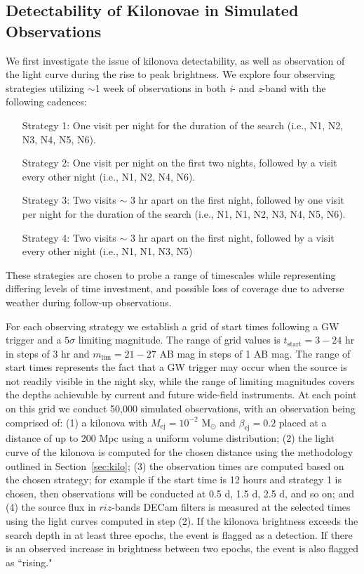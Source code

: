 \subsection{Detectability of Kilonovae in Simulated Observations}
\label{sec:MCsims_det}
We first investigate the issue of kilonova detectability, as well as observation of the light curve during the rise to peak brightness. We explore four observing strategies utilizing $\sim$1 week of observations in both {\em i}- and {\em z}-band with the following cadences:
{\small \begin{enumerate}[leftmargin = 2.5cm]
\item[Strategy 1:] One visit per night for the duration of the search (i.e., N1, N2, N3, N4, N5, N6). 
\item[Strategy 2:]  One visit per night on the first two nights, followed by a visit every other night (i.e., N1, N2, N4, N6).
\item[Strategy 3:]  Two visits $\sim$ 3 hr apart on the first night, followed by one visit per night for the duration of the search (i.e., N1, N1, N2, N3, N4, N5, N6). 
\item[Strategy 4:]  Two visits $\sim$ 3 hr apart on the first night, followed by a visit every other night (i.e., N1, N1, N3, N5)
\end{enumerate}}
\noindent These strategies are chosen to probe a range of timescales while representing differing levels of time investment, and possible loss of coverage due to adverse weather during follow-up observations. 
   
For each observing strategy we establish a grid of start times following a GW trigger and a $5\sigma$ limiting magnitude. The range of grid values is $t_{\text{start}} = 3-24$ hr in steps of 3 hr and $m_{\text{lim}} = 21-27$ AB mag in steps of 1 AB mag. The range of start times represents the fact that a GW trigger may occur when the source is not readily visible in the night sky, while the range of limiting magnitudes covers the depths achievable by current and future wide-field instruments. At each point on this grid we conduct 50,000 simulated observations, with an observation being comprised of: (1) a kilonova with $M_{\text{ej}} = 10^{-2} \text{ M}_{\odot}$ and $\beta_{\text{ej}} = 0.2$ placed at a distance of up to 200 Mpc using a uniform volume distribution; (2) the light curve of the kilonova is computed for the chosen distance using the methodology outlined in Section~\ref{sec:kilo}; (3) the observation times are computed based on the chosen strategy; for example if the start time is 12 hours and strategy 1 is chosen, then observations will be conducted at 0.5 d, 1.5 d, 2.5 d, and so on; and (4) the source flux in $riz$-bands DECam filters is measured at the selected times using the light curves computed in step (2). If the kilonova brightness exceeds the search depth in at least three epochs, the event is flagged as a detection. If there is an observed increase in brightness between two epochs, the event is also flagged as ``rising."
 
